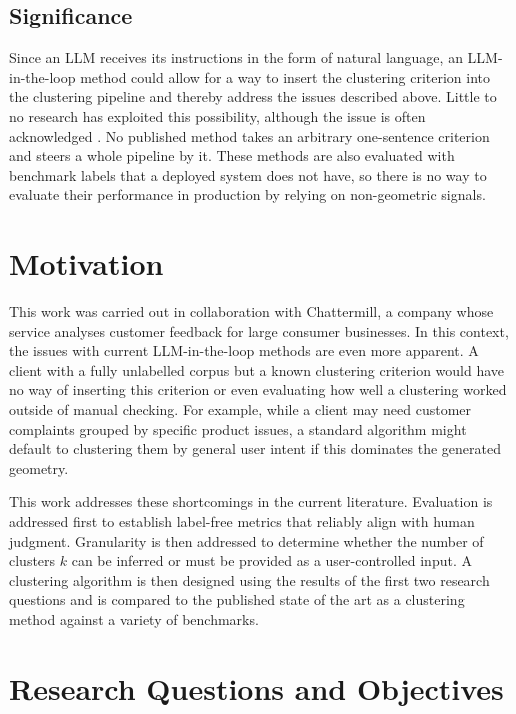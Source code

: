 \documentclass[11pt,a4paper,oneside]{report}
\begin{document}
\subsection{Significance}

Since an LLM receives its instructions in the form of natural language, an LLM-in-the-loop method could allow for a way to insert the clustering criterion into the clustering pipeline and thereby address the issues described above. Little to no research has exploited this possibility, although the issue is often acknowledged \citep{vonluxburg2012science,su2023instructor,zhang2023clusterllm}. No published method takes an arbitrary one-sentence criterion and steers a whole pipeline by it. These methods are also evaluated with benchmark labels that a deployed system does not have, so there is no way to evaluate their performance in production by relying on non-geometric signals.

\section{Motivation}

This work was carried out in collaboration with Chattermill, a company whose service analyses customer feedback for large consumer businesses. In this context, the issues with current LLM-in-the-loop methods are even more apparent. A client with a fully unlabelled corpus but a known clustering criterion would have no way of inserting this criterion or even evaluating how well a clustering worked outside of manual checking. For example, while a client may need customer complaints grouped by specific product issues, a standard algorithm might default to clustering them by general user intent if this dominates the generated geometry.

This work addresses these shortcomings in the current literature. Evaluation is addressed first to establish label-free metrics that reliably align with human judgment. Granularity is then addressed to determine whether the number of clusters $k$ can be inferred or must be provided as a user-controlled input. A clustering algorithm is then designed using the results of the first two research questions and is compared to the published state of the art as a clustering method against a variety of benchmarks.

\section{Research Questions and Objectives}
\end{document}
